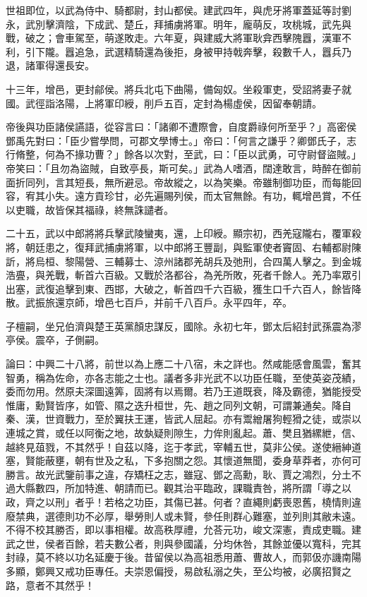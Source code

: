 \begin{pinyinscope}
世祖即位，以武為侍中、騎都尉，封山都侯。建武四年，與虎牙將軍蓋延等討劉永，武別擊濟陰，下成武、楚丘，拜捕虜將軍。明年，龐萌反，攻桃城，武先與戰，破之；會車駕至，萌遂敗走。六年夏，與建威大將軍耿弇西擊隗囂，漢軍不利，引下隴。囂追急，武選精騎還為後拒，身被甲持戟奔擊，殺數千人，囂兵乃退，諸軍得還長安。

十三年，增邑，更封鄃侯。將兵北屯下曲陽，備匈奴。坐殺軍吏，受詔將妻子就國。武徑詣洛陽，上將軍印綬，削戶五百，定封為楊虛侯，因留奉朝請。

帝後與功臣諸侯讌語，從容言曰：「諸卿不遭際會，自度爵祿何所至乎？」高密侯鄧禹先對曰：「臣少嘗學問，可郡文學博士。」帝曰：「何言之謙乎？卿鄧氏子，志行脩整，何為不掾功曹？」餘各以次對，至武，曰：「臣以武勇，可守尉督盜賊。」帝笑曰：「且勿為盜賊，自致亭長，斯可矣。」武為人嗜酒，闊達敢言，時醉在御前面折同列，言其短長，無所避忌。帝故縱之，以為笑樂。帝雖制御功臣，而每能回容，宥其小失。遠方貢珍甘，必先遍賜列侯，而太官無餘。有功，輒增邑賞，不任以吏職，故皆保其福祿，終無誅譴者。

二十五，武以中郎將將兵擊武陵蠻夷，還，上印綬。顯宗初，西羌寇隴右，覆軍殺將，朝廷患之，復拜武捕虜將軍，以中郎將王豐副，與監軍使者竇固、右輔都尉陳訢，將烏桓、黎陽營、三輔募士、涼州諸郡羌胡兵及弛刑，合四萬人擊之。到金城浩亹，與羌戰，斬首六百級。又戰於洛都谷，為羌所敗，死者千餘人。羌乃率眾引出塞，武復追擊到東、西邯，大破之，斬首四千六百級，獲生口千六百人，餘皆降散。武振旅還京師，增邑七百戶，并前千八百戶。永平四年，卒。

子檀嗣，坐兄伯濟與楚王英黨顏忠謀反，國除。永初七年，鄧太后紹封武孫震為漻亭侯。震卒，子側嗣。

論曰：中興二十八將，前世以為上應二十八宿，未之詳也。然咸能感會風雲，奮其智勇，稱為佐命，亦各志能之士也。議者多非光武不以功臣任職，至使英姿茂績，委而勿用。然原夫深圖遠筭，固將有以焉爾。若乃王道既衰，降及霸德，猶能授受惟庸，勳賢皆序，如管、隰之迭升桓世，先、趙之同列文朝，可謂兼通矣。降自秦、漢，世資戰力，至於翼扶王運，皆武人屈起。亦有鬻繒屠狗輕猾之徒，或崇以連城之賞，或任以阿衡之地，故埶疑則隙生，力侔則亂起。蕭、樊且猶縲紲，信、越終見葅戮，不其然乎！自茲以降，迄于孝武，宰輔五世，莫非公侯。遂使縉紳道塞，賢能蔽壅，朝有世及之私，下多抱關之怨。其懷道無聞，委身草莽者，亦何可勝言。故光武鑒前事之違，存矯枉之志，雖寇、鄧之高勳，耿、賈之鴻烈，分土不過大縣數四，所加特進、朝請而已。觀其治平臨政，課職責咎，將所謂「導之以政，齊之以刑」者乎！若格之功臣，其傷已甚。何者？直繩則虧喪恩舊，橈情則違廢禁典，選德則功不必厚，舉勞則人或未賢，參任則群心難塞，並列則其敝未遠。不得不校其勝否，即以事相權。故高秩厚禮，允荅元功，峻文深憲，責成吏職。建武之世，侯者百餘，若夫數公者，則與參國議，分均休咎，其餘並優以寬科，完其封祿，莫不終以功名延慶于後。昔留侯以為高祖悉用蕭、曹故人，而郭伋亦譏南陽多顯，鄭興又戒功臣專任。夫崇恩偏授，易啟私溺之失，至公均被，必廣招賢之路，意者不其然乎！


\end{pinyinscope}
